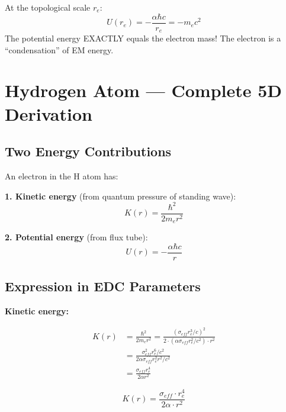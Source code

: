 \documentclass[12pt,a4paper]{article}
\begin{document}
\begin{physicalinsight}
At the topological scale $r_e$:
\begin{equation}
U(r_e) = -\frac{\alpha \hbar c}{r_e} = -m_e c^2
\end{equation}
The potential energy EXACTLY equals the electron mass! The electron is a ``condensation'' of EM energy.
\end{physicalinsight}

\section{Hydrogen Atom --- Complete 5D Derivation}

\subsection{Two Energy Contributions}

An electron in the H atom has:

\textbf{1. Kinetic energy} (from quantum pressure of standing wave):
\begin{equation}
K(r) = \frac{\hbar^2}{2m_e r^2}
\end{equation}

\textbf{2. Potential energy} (from flux tube):
\begin{equation}
U(r) = -\frac{\alpha \hbar c}{r}
\end{equation}

\subsection{Expression in EDC Parameters}

\textbf{Kinetic energy:}

\begin{align}
K(r) &= \frac{\hbar^2}{2m_e r^2} = \frac{(\sigma_{eff} r_e^3 / c)^2}{2 \cdot (\alpha \sigma_{eff} r_e^2 / c^2) \cdot r^2} \\[0.3cm]
&= \frac{\sigma_{eff}^2 r_e^6 / c^2}{2\alpha \sigma_{eff} r_e^2 r^2 / c^2} \\[0.3cm]
&= \frac{\sigma_{eff} r_e^4}{2\alpha r^2}
\end{align}

\begin{keyresult}
\begin{equation}
\boxed{K(r) = \frac{\sigma_{eff} \cdot r_e^4}{2\alpha \cdot r^2}}
\end{equation}
\end{keyresult}
\end{document}
